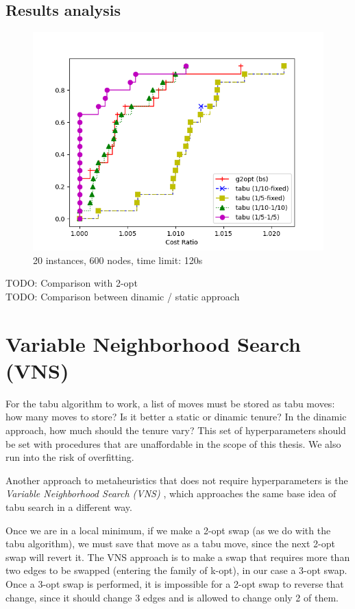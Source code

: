 \subsection{Results analysis}

\begin{figure}[h]
    \centering
    \includegraphics*[width=.6\textwidth]{../plots/perfprof_tabu_costs.png}
    \caption*{20 instances, 600 nodes, time limit: 120s}
\end{figure}



TODO: Comparison with 2-opt\\

TODO: Comparison between dinamic / static approach
\section{Variable Neighborhood Search (VNS)}

For the tabu algorithm to work, a list of moves must be stored as tabu moves: how many moves to store? Is it better a static or dinamic tenure? In the dinamic approach, how much should the tenure vary? This set of  hyperparameters should be set with procedures that are unaffordable in the scope of this thesis. We also run into the risk of overfitting.

Another approach to metaheuristics that does not require hyperparameters is the \textit{Variable Neighborhood Search (VNS)} \cite{hansen_vns}, which approaches the same base idea of tabu search in a different way.

Once we are in a local minimum, if we make a 2-opt swap (as we do with the tabu algorithm), we must save that move as a tabu move, since the next 2-opt swap will revert it. The VNS approach is to make a swap that requires more than two edges to be swapped (entering the family of k-opt), in our case a 3-opt swap. Once a 3-opt swap is performed, it is impossible for a 2-opt swap to reverse that change, since it should change 3 edges and is allowed to change only 2 of them.

